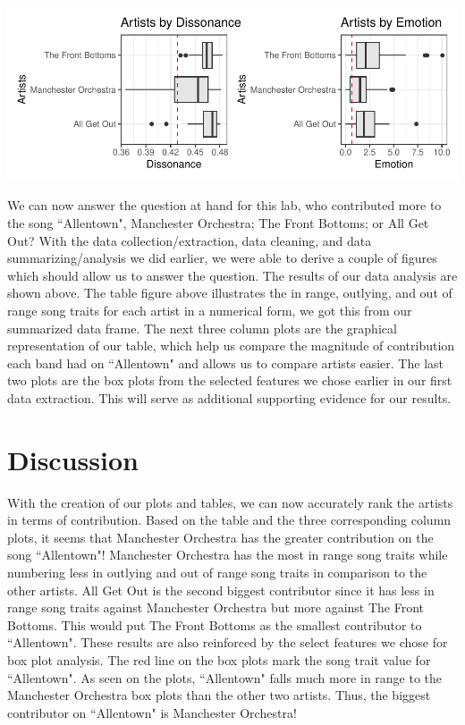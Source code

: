 \documentclass{article}\usepackage[]{graphicx}\usepackage[]{xcolor}
\makeatletter
\def\maxwidth{ %
  \ifdim\Gin@nat@width>\linewidth
    \linewidth
  \else
    \Gin@nat@width
  \fi
}
\newenvironment{knitrout}{}{} %
\makeatother
\begin{document}
\begin{knitrout}
\color{fgcolor}
\includegraphics[width=\maxwidth]{figure/unnamed-chunk-3-1} 
\end{knitrout}

\begin{multicols}{2}
We can now answer the question at hand for this lab, who contributed more to the song ``Allentown", Manchester Orchestra; The Front Bottoms; or All Get Out? With the data collection/extraction, data cleaning, and data summarizing/analysis we did earlier, we were able to derive a couple of figures which should allow us to answer the question. The results of our data analysis are shown above. The table figure above illustrates the in range, outlying, and out of range song traits for each artist in a numerical form, we got this from our summarized data frame. The next three column plots are the graphical representation of our table, which help us compare the magnitude of contribution each band had on ``Allentown" and allows us to compare artists easier. The last two plots are the box plots from the selected features we chose earlier in our first data extraction. This will serve as additional supporting evidence for our results. 



\columnbreak
\section{Discussion}
With the creation of our plots and tables, we can now accurately rank the artists in terms of contribution. Based on the table and the three corresponding column plots, it seems that Manchester Orchestra has the greater contribution on the song ``Allentown"! Manchester Orchestra has the most in range song traits while numbering less in outlying and out of range song traits in comparison to the other artists. All Get Out is the second biggest contributor since it has less in range song traits against Manchester Orchestra but more against The Front Bottoms. This would put The Front Bottoms as the smallest contributor to ``Allentown". These results are also reinforced by the select features we chose for box plot analysis. The red line on the box plots mark the song trait value for ``Allentown". As seen on the plots, ``Allentown" falls much more in range to the Manchester Orchestra box plots than the other two artists. Thus, the biggest contributor on ``Allentown" is Manchester Orchestra!


\end{multicols}
\end{document}
